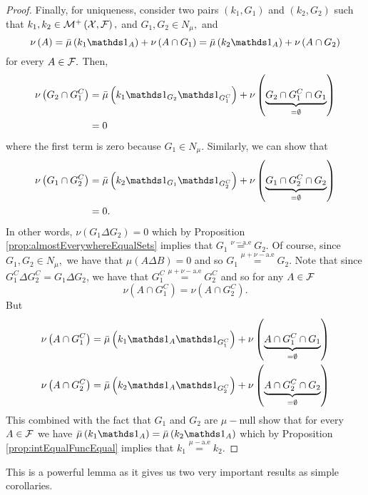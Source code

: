 \begin{proof}
Finally, for uniqueness, consider two pairs $\left(k_{1},G_{1}\right)$
and $\left(k_{2},G_{2}\right)$ such that $k_{1},k_{2}\in\mathcal{M}^{+}\left(\mathcal{X},\mathcal{F}\right),$
and $G_{1},G_{2}\in N_{\mu},$ and
\[
\nu\left(A\right)=\lebInt{\mu}{k_{1}\indicate_{A}}+\nu\left(A\cap G_{1}\right)=\lebInt{\mu}{k_{2}\indicate_{A}}+\nu\left(A\cap G_{2}\right)
\]
for every $A\in\mathcal{F}.$ Then,
\begin{align*}
\nu\left(G_{2}\cap G_{1}^{C}\right) & =\lebInt{\mu}{k_{1}\indicate_{G_{2}}\indicate_{G_{1}^{C}}}+\nu\left(\underbrace{G_{2}\cap G_{1}^{C}\cap G_{1}}_{=\emptyset}\right)\\
 & =0
\end{align*}
where the first term is zero because $G_{1}\in N_{\mu}.$ Similarly,
we can show that 
\begin{align*}
\nu\left(G_{1}\cap G_{2}^{C}\right) & =\lebInt{\mu}{k_{2}\indicate_{G_{1}}\indicate_{G_{2}^{C}}}+\nu\left(\underbrace{G_{1}\cap G_{2}^{C}\cap G_{2}}_{=\emptyset}\right)\\
 & =0.
\end{align*}
In other words, $\nu\left(G_{1}\Delta G_{2}\right)=0$ which by Proposition
\ref{prop:almostEverywhereEqualSets} implies that $G_{1}\stackrel{\nu-\text{a.e}}{=}G_{2}.$
Of course, since $G_{1},G_{2}\in N_{\mu},$ we have that $\mu\left(A\Delta B\right)=0$
and so $G_{1}\stackrel{\mu+\nu-\text{a.e}}{=}G_{2}.$ Note that since
$G_{1}^{C}\Delta G_{2}^{C}=G_{1}\Delta G_{2}$, we have that $G_{1}^{C}\stackrel{\mu+\nu-\text{a.e}}{=}G_{2}^{C}$
and so for any $A\in\mathcal{F}$
\[
\nu\left(A\cap G_{1}^{C}\right)=\nu\left(A\cap G_{2}^{C}\right).
\]
But
\begin{align*}
\nu\left(A\cap G_{1}^{C}\right) & =\lebInt{\mu}{k_{1}\indicate_{A}\indicate_{G_{1}^{C}}}+\nu\left(\underbrace{A\cap G_{1}^{C}\cap G_{1}}_{=\emptyset}\right)\\
\nu\left(A\cap G_{2}^{C}\right) & =\lebInt{\mu}{k_{2}\indicate_{A}\indicate_{G_{2}^{C}}}+\nu\left(\underbrace{A\cap G_{2}^{C}\cap G_{2}}_{=\emptyset}\right)
\end{align*}
This combined with the fact that $G_{1}$ and $G_{2}$ are $\mu-$null
show that for every $A\in\mathcal{F}$ we have $\lebInt{\mu}{k_{1}\indicate_{A}}=\lebInt{\mu}{k_{2}\indicate_{A}}$
which by Proposition \ref{prop:intEqualFuncEqual} implies that $k_{1}\stackrel{\mu-\text{a.e}}{=}k_{2}.$
\end{proof}
This is a powerful lemma as it gives us two very important results
as simple corollaries.
